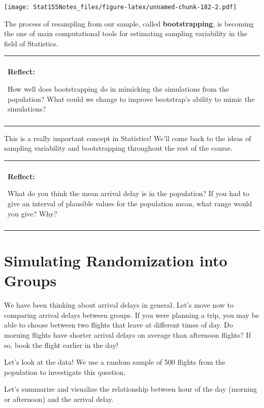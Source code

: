 \documentclass[]{book}
\newenvironment{Shaded}{\begin{snugshade}}{\end{snugshade}}
\newcommand{\DataTypeTok}[1]{\textcolor[rgb]{0.13,0.29,0.53}{#1}}
\newcommand{\DecValTok}[1]{\textcolor[rgb]{0.00,0.00,0.81}{#1}}
\newcommand{\KeywordTok}[1]{\textcolor[rgb]{0.13,0.29,0.53}{\textbf{#1}}}
\newcommand{\NormalTok}[1]{#1}
\newcommand{\OperatorTok}[1]{\textcolor[rgb]{0.81,0.36,0.00}{\textbf{#1}}}
\newcommand{\StringTok}[1]{\textcolor[rgb]{0.31,0.60,0.02}{#1}}
\newenvironment{reflect}
{
    \begin{center}
    
    \begin{tabular}{|p{0.8\textwidth}|}
    \rowcolor{LightBlue}
    \hline\\
    \rowcolor{LightBlue}
    \textbf{Reflect:}
}
{
    \\\rowcolor{LightBlue}
    \\\hline
    \end{tabular} 
    \end{center}
}
\begin{document}
\texttt{[image: Stat155Notes\_files/figure-latex/unnamed-chunk-182-2.pdf]}

The process of resampling from our sample, called \textbf{bootstrapping}, is becoming the one of main computational tools for estimating sampling variability in the field of Statistics.

\begin{reflect}
How well does bootstrapping do in mimicking the simulations from the
population? What could we change to improve bootstrap's ability to mimic
the simulations?
\end{reflect}

This is a really important concept in Statistics! We'll come back to the ideas of sampling variability and bootstrapping throughout the rest of the course.

\begin{reflect}
What do you think the mean arrival delay is in the population? If you
had to give an interval of plausible values for the population mean,
what range would you give? Why?
\end{reflect}

\hypertarget{simulating-randomization-into-groups}{%
\section{Simulating Randomization into Groups}\label{simulating-randomization-into-groups}}

We have been thinking about arrival delays in general. Let's move now to comparing arrival delays between groups. If you were planning a trip, you may be able to choose between two flights that leave at different times of day. Do morning flights have shorter arrival delays on average than afternoon flights? If so, book the flight earlier in the day!

Let's look at the data! We use a random sample of 500 flights from the population to investigate this question.

\begin{Shaded}
\end{Shaded}

Let's summarize and visualize the relationship between hour of the day (morning or afternoon) and the arrival delay.
\end{document}
